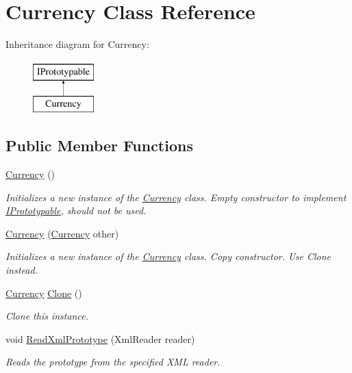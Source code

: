 \hypertarget{class_currency}{}\section{Currency Class Reference}
\label{class_currency}
Inheritance diagram for Currency\+:\begin{figure}[H]
\begin{center}
\leavevmode
\includegraphics[height=2.000000cm]{class_currency}
\end{center}
\end{figure}
\subsection*{Public Member Functions}
\begin{DoxyCompactItemize}
\item 
\hyperlink{class_currency_a647aa77f24ecbb8e4258047be6aa6b0a}{Currency} ()
\begin{DoxyCompactList}\small\item\em Initializes a new instance of the \hyperlink{class_currency}{Currency} class. Empty constructor to implement \hyperlink{interface_i_prototypable}{I\+Prototypable}, should not be used. \end{DoxyCompactList}\item 
\hyperlink{class_currency_ace384f1ac7187d836be9829284b75dbe}{Currency} (\hyperlink{class_currency}{Currency} other)
\begin{DoxyCompactList}\small\item\em Initializes a new instance of the \hyperlink{class_currency}{Currency} class. Copy constructor. Use Clone instead. \end{DoxyCompactList}\item 
\hyperlink{class_currency}{Currency} \hyperlink{class_currency_addd39e17adc2603bf12c600e23db9884}{Clone} ()
\begin{DoxyCompactList}\small\item\em Clone this instance. \end{DoxyCompactList}\item 
void \hyperlink{class_currency_a353f4810761ac68141a62c78fa248fc4}{Read\+Xml\+Prototype} (Xml\+Reader reader)
\begin{DoxyCompactList}\small\item\em Reads the prototype from the specified X\+ML reader. \end{DoxyCompactList}\end{DoxyCompactItemize}
